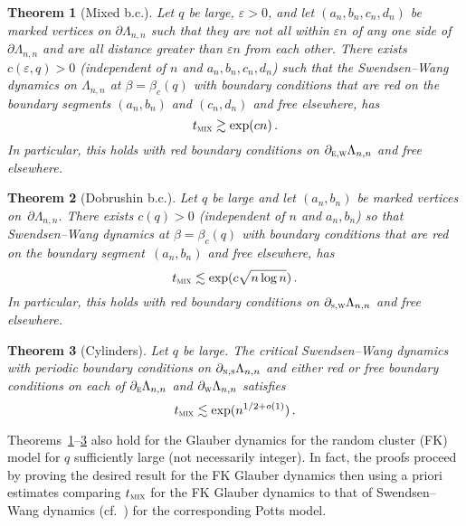 \documentclass[reqno,11pt]{amsart}
\numberwithin{equation}{section}
\renewcommand{\epsilon}{\varepsilon}
\newtheorem{maintheorem}{Theorem}
\theoremstyle{definition}{
\newtheorem{example}[theorem]{Example}
\newtheorem{definition}[theorem]{Definition}
\newtheorem*{definition*}{Definition}
\newtheorem{problem}[theorem]{Problem}
\newtheorem{question}[theorem]{Question}
\newtheorem{remark}[theorem]{Remark}
}
\renewcommand{\epsilon}{\varepsilon}
\newcommand{\tmix}{t_{\textsc{mix}}}
\newcommand{\north}{{\textsc{n}}}
\newcommand{\south}{{\textsc{s}}}
\newcommand{\east}{{\textsc{e}}}
\newcommand{\west}{{\textsc{w}}}
\begin{document}
\begin{maintheorem}[Mixed b.c.]\label{mainthm:1}
Let $q$ be large, $\epsilon>0$, and let $(a_n,b_n,c_n,d_n)$ be marked vertices on $\partial \Lambda_{n,n}$ such that they are not all within $\epsilon n$ of any one side of $\partial \Lambda_{n,n}$ and are all distance greater than $\epsilon n$ from each other. There exists $c(\epsilon,q)>0$ (independent of $n$ and $a_n,b_n,c_n,d_n$) such that the Swendsen--Wang dynamics on $\Lambda_{n,n}$ at $\beta=\beta_c(q)$ with boundary conditions that are red on the boundary segments $(a_n,b_n)$ and $(c_n,d_n)$ and free elsewhere, has
\[\tmix \gtrsim \exp(c n)\,.
\]
In particular, this holds with red boundary conditions on $\partial_{\east,\west} \Lambda_{n,n}$ and free elsewhere.
\end{maintheorem}

\begin{maintheorem}[Dobrushin b.c.] \label{mainthm:2}
Let $q$ be large and let $(a_n,b_n)$ be marked vertices on~$\partial \Lambda_{n,n}$. There exists $c(q)>0$ (independent of $n$ and $a_n,b_n$) so that  Swendsen--Wang dynamics at $\beta=\beta_c(q)$ with  boundary conditions that are red on the boundary segment~$(a_n,b_n)$ and free elsewhere, has
\[\tmix \lesssim \exp(c\sqrt{n\log n})\,.
\]
In particular, this holds with red boundary conditions on $\partial_{\south,\west} \Lambda_{n,n}$ and free elsewhere.
\end{maintheorem}

\begin{maintheorem}[Cylinders] \label{mainthm:3}
Let $q$ be large. The critical Swendsen--Wang dynamics with periodic boundary conditions on $\partial_{\north,\south} \Lambda_{n,n}$ and either red or free boundary conditions on each of $\partial_\east\Lambda_{n,n}$ and $\partial_\west \Lambda_{n,n}$ satisfies
\[\tmix\lesssim \exp(n^{1/2+o(1)})\,.
\]
\end{maintheorem}

\begin{remark}\label{rem:other-dynamics}
Theorems~\ref{mainthm:1}--\ref{mainthm:3} also hold for the Glauber dynamics for the random cluster (FK) model for $q$ sufficiently large (not necessarily integer). In fact, the proofs proceed by proving the desired result for the FK Glauber dynamics then using a priori estimates comparing $\tmix$ for the FK Glauber dynamics to that of Swendsen--Wang dynamics (cf.~\cite{Ul13,Ul14}) for the corresponding Potts model.  
\end{remark}
\end{document}
